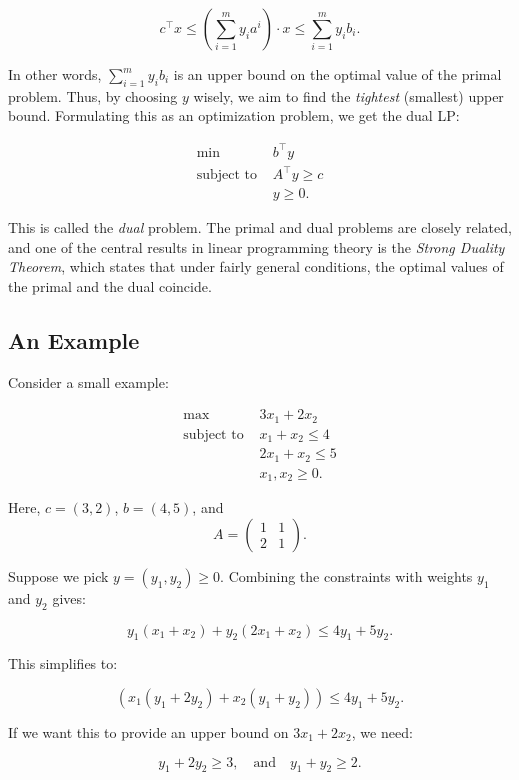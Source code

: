 \[
c^\top x \leq \left(\sum_{i=1}^m y_i a^i\right) \cdot x \leq \sum_{i=1}^m y_i b_i.
\]

In other words, $\sum_{i=1}^m y_i b_i$ is an upper bound on the optimal value of the primal problem. Thus, by choosing $y$ wisely, we aim to find the \emph{tightest} (smallest) upper bound. Formulating this as an optimization problem, we get the dual LP:

\[
\begin{aligned}
\min \; & b^\top y \\
\text{subject to } & A^\top y \geq c \\
& y \geq 0.
\end{aligned}
\]

This is called the \emph{dual} problem. The primal and dual problems are closely related, and one of the central results in linear programming theory is the \emph{Strong Duality Theorem}, which states that under fairly general conditions, the optimal values of the primal and the dual coincide.

\subsection*{An Example}

Consider a small example:

\[
\begin{aligned}
\max \; & 3x_1 + 2x_2 \\
\text{subject to } & x_1 + x_2 \leq 4 \\
& 2x_1 + x_2 \leq 5 \\
& x_1, x_2 \geq 0.
\end{aligned}
\]

Here, $c = (3, 2)$, $b = (4, 5)$, and
\[
A = \begin{pmatrix}
1 & 1 \\
2 & 1
\end{pmatrix}.
\]

Suppose we pick $y = (y_1, y_2) \geq 0$. Combining the constraints with weights $y_1$ and $y_2$ gives:

\[
y_1(x_1 + x_2) + y_2(2x_1 + x_2) \leq 4y_1 + 5y_2.
\]

This simplifies to:

\[
(x_1( y_1 + 2y_2 ) + x_2(y_1 + y_2)) \leq 4y_1 + 5y_2.
\]

If we want this to provide an upper bound on $3x_1 + 2x_2$, we need:

\[
y_1 + 2y_2 \geq 3, \quad \text{and} \quad y_1 + y_2 \geq 2.
\]


